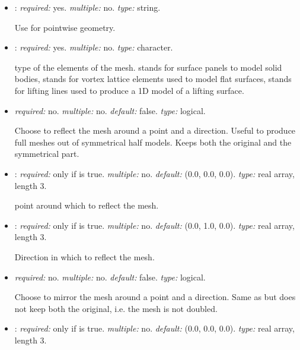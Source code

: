 \begin{itemize}

\item {}: \textit{required:} yes. \textit{multiple:} no. \textit{type:} string. 

Use  for pointwise geometry.

\item {}: \textit{required:} yes. \textit{multiple:} no. \textit{type:} character.

    type of the elements of the mesh.  stands for surface panels to model solid bodies,  stands for vortex lattice elements used to model flat surfaces, {\color{red} stands for lifting lines used to produce a 1D model of a lifting surface}. 

\item {} \textit{required:} no. \textit{multiple:} no. \textit{default:} false. \textit{type:} logical.

Choose to reflect the mesh around a point and a direction. Useful to produce full meshes out of symmetrical half models. Keeps both the original and the symmetrical part. 

\item {}: \textit{required:} only if  is true. \textit{multiple:} no. \textit{default:} (0.0, 0.0, 0.0). \textit{type:} real array, length 3.

point around which to reflect the mesh.

\item {}: \textit{required:} only if  is true. \textit{multiple:} no. \textit{default:} (0.0, 1.0, 0.0). \textit{type:} real array, length 3.

Direction in which to reflect the mesh.

\item {} \textit{required:} no. \textit{multiple:} no. \textit{default:} false. \textit{type:} logical.

Choose to mirror the mesh around a point and a direction. Same as  but does not keep both the original, i.e. the mesh is not doubled.

\item {}: \textit{required:} only if  is true. \textit{multiple:} no. \textit{default:} (0.0, 0.0, 0.0). \textit{type:} real array, length 3.


\end{itemize}
